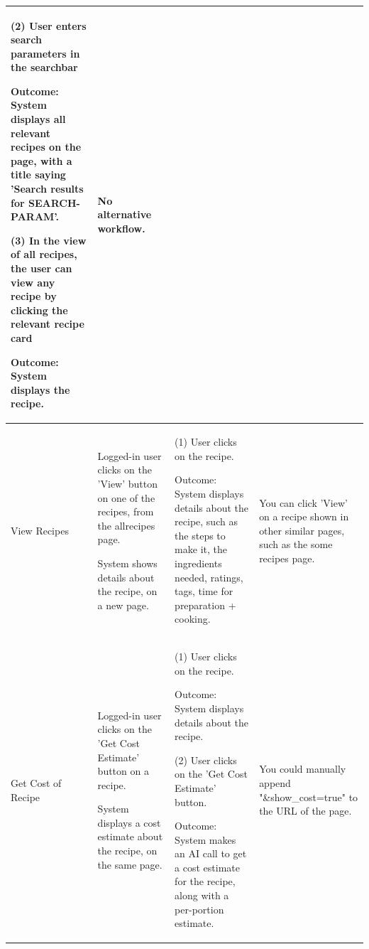\documentclass[10pt,a4paper]{article}
\begin{document}
\begin{longtable}{|p{30mm}|p{30mm}|p{40mm}|p{40mm}|}
(2) User enters search parameters in the searchbar

Outcome: System displays all relevant recipes on the page, with a title saying 'Search results for SEARCH-PARAM'.

\vspace{1 mm}

(3) In the view of all recipes, the user can view any recipe by clicking the relevant recipe card

Outcome: System displays the recipe.
&
No alternative workflow. \\






\hline
View Recipes
&
Logged-in user clicks on the 'View' button on one of the recipes, from the allrecipes page.

System shows details about the recipe, on a new page.
&
(1) User clicks on the recipe.

\vspace{1 mm}

Outcome: System displays details about the recipe, such as the steps to make it, the ingredients needed, ratings, tags, time for preparation + cooking.

&
You can click 'View' on a recipe shown in other similar pages, such as the some recipes page. \\






\hline
Get Cost of Recipe
&
Logged-in user clicks on the 'Get Cost Estimate' button on a recipe.

System displays a cost estimate about the recipe, on the same page.
&
(1) User clicks on the recipe.

\vspace{1 mm}

Outcome: System displays details about the recipe.

\vspace{1 mm}

(2) User clicks on the 'Get Cost Estimate' button.

Outcome: System makes an AI call to get a cost estimate for the recipe, along with a per-portion estimate.

&
You could manually append "\&show\_cost=true" to the URL of the page. \\







\end{longtable}
\end{document}
